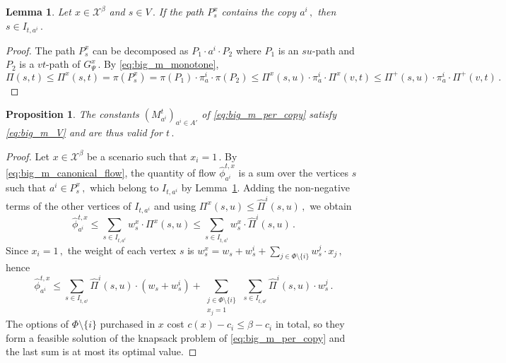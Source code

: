 \documentclass[11pt,a4paper]{report}
\newtheorem{proposition}[theorem]{Proposition}
\newtheorem{lemma}[theorem]{Lemma}
\theoremstyle{definition}
\theoremstyle{remark}
\begin{document}
\begin{lemma}\label{lemma:big_m_source_filter}
  Let $x \in \mathcal{X}^\beta$ and $s \in V\,.$ If the path $P^x_s$ contains the copy $a^i\,,$ then $s \in I_{t,a^i}\,.$
\end{lemma}

\begin{proof}
  The path $P^x_s$ can be decomposed as $P_1 \cdot a^i \cdot P_2$ where $P_1$ is an $su$-path and $P_2$ is a $vt$-path of $G^x_\Psi\,.$ By \eqref{eq:big_m_monotone},
  \begin{equation}
    \Pi(s,t) \leq \Pi^x(s,t) = \pi(P^x_s) = \pi(P_1) \cdot \pi^i_a \cdot \pi(P_2) \leq \Pi^x(s,u) \cdot \pi^i_a \cdot \Pi^x(v,t) \leq \Pi^+(s,u) \cdot \pi^i_a \cdot \Pi^+(v,t)\,.
  \end{equation}
\end{proof}

\begin{proposition}\label{prop:big_m_per_copy}
  The constants $(M^t_{a^i})_{a^i \in A'}$ of \eqref{eq:big_m_per_copy} satisfy \eqref{eq:big_m_V} and are thus valid for $t\,.$
\end{proposition}

\begin{proof}
  Let $x \in \mathcal{X}^\beta$ be a scenario such that $x_i = 1\,.$ By \eqref{eq:big_m_canonical_flow}, the quantity of flow $\hat{\phi}^{t,x}_{a^i}$ is a sum over the vertices $s$ such that $a^i \in P^x_s\,,$ which belong to $I_{t,a^i}$ by Lemma~\ref{lemma:big_m_source_filter}. Adding the non-negative terms of the other vertices of $I_{t,a^i}$ and using $\Pi^x(s,u) \leq \widehat{\Pi}^i(s,u)\,,$ we obtain
  \begin{equation}
    \hat{\phi}^{t,x}_{a^i} \leq \sum_{s \in I_{t,a^i}} w^x_s \cdot \Pi^x(s,u) \leq \sum_{s \in I_{t,a^i}} w^x_s \cdot \widehat{\Pi}^i(s,u)\,.
  \end{equation}
  Since $x_i = 1\,,$ the weight of each vertex $s$ is $w^x_s = w_s + w^i_s + \sum_{j \in \Phi \setminus \{i\}} w^j_s \cdot x_j\,,$ hence
  \begin{equation}
    \hat{\phi}^{t,x}_{a^i} \leq \sum_{s \in I_{t,a^i}} \widehat{\Pi}^i(s,u) \cdot \left(w_s + w^i_s\right) + \sum_{\substack{j \in \Phi \setminus \{i\} \\ x_j = 1}} \, \sum_{s \in I_{t,a^i}} \widehat{\Pi}^i(s,u) \cdot w^j_s\,.
  \end{equation}
  The options of $\Phi \setminus \{i\}$ purchased in $x$ cost $c(x) - c_i \leq \beta - c_i$ in total, so they form a feasible solution of the knapsack problem of \eqref{eq:big_m_per_copy} and the last sum is at most its optimal value.
\end{proof}
\end{document}
